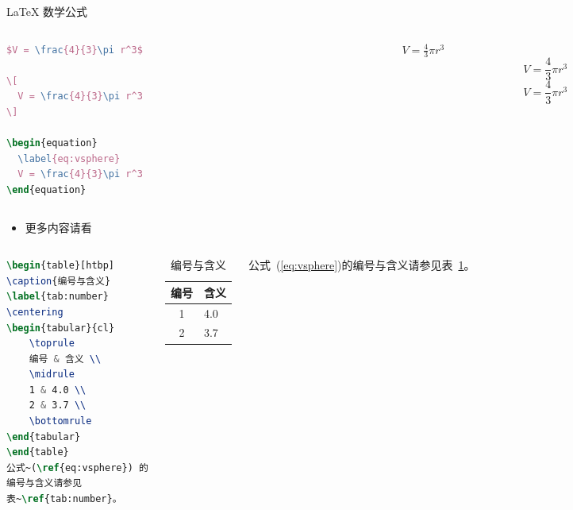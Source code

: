\documentclass{ctexbeamer}
\begin{document}
\begin{frame}[fragile]{\LaTeX{} 数学公式}
	\begin{columns}
		\begin{column}{.55\textwidth}
			\begin{lstlisting}[language=TeX]
$V = \frac{4}{3}\pi r^3$

\[
  V = \frac{4}{3}\pi r^3
\]

\begin{equation}
  \label{eq:vsphere}
  V = \frac{4}{3}\pi r^3
\end{equation}
\end{lstlisting}
		\end{column}
		\begin{column}{.4\textwidth}
			$V = \frac{4}{3}\pi r^3$
			\[
				V = \frac{4}{3}\pi r^3
			\]
			\begin{equation}
				\label{eq:vsphere}
				V = \frac{4}{3}\pi r^3
			\end{equation}
		\end{column}
	\end{columns}
	\begin{itemize}
		\item 更多内容请看 \href{https://zh.wikipedia.org/wiki/Help:数学公式}{\color{purple}{这里}}
	\end{itemize}
\end{frame}

\begin{frame}[fragile]
	\begin{columns}
		\column{.6\textwidth}
		\begin{lstlisting}[language=TeX]
\begin{table}[htbp]
\caption{编号与含义}
\label{tab:number}
\centering
\begin{tabular}{cl}
    \toprule
    编号 & 含义 \\
    \midrule
    1 & 4.0 \\
    2 & 3.7 \\
    \bottomrule
\end{tabular}
\end{table}
公式~(\ref{eq:vsphere}) 的
编号与含义请参见
表~\ref{tab:number}。
\end{lstlisting}
		\column{.4\textwidth}
		\begin{table}[htpb]
			\centering
			\caption{编号与含义}
			\label{tab:number}
			\begin{tabular}{cl}\toprule
				编号 & 含义  \\\midrule
				1  & 4.0 \\
				2  & 3.7 \\\bottomrule
			\end{tabular}
		\end{table}
		\normalsize 公式~(\ref{eq:vsphere})的编号与含义请参见表~\ref{tab:number}。
	\end{columns}
\end{frame}
\end{document}
